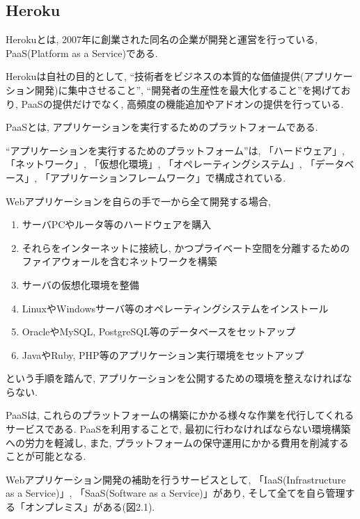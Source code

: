 \subsection{Heroku}
Herokuとは, 2007年に創業された同名の企業が開発と運営を行っている, PaaS(Platform as a Service)である.

Herokuは自社の目的として, “技術者をビジネスの本質的な価値提供(アプリケーション開発)に集中させること”, “開発者の生産性を最大化すること”を掲げており, PaaSの提供だけでなく, 高頻度の機能追加やアドオンの提供を行っている.

PaaSとは, アプリケーションを実行するためのプラットフォームである.

“アプリケーションを実行するためのプラットフォーム”は, 「ハードウェア」, 「ネットワーク」, 「仮想化環境」, 「オペレーティングシステム」, 「データベース」, 「アプリケーションフレームワーク」で構成されている.

Webアプリケーションを自らの手で一から全て開発する場合,

\begin{enumerate}
\item サーバPCやルータ等のハードウェアを購入

\item それらをインターネットに接続し, かつプライベート空間を分離するためのファイアウォールを含むネットワークを構築

\item サーバの仮想化環境を整備

\item LinuxやWindowsサーバ等のオペレーティングシステムをインストール

\item OracleやMySQL, PostgreSQL等のデータベースをセットアップ

\item JavaやRuby, PHP等のアプリケーション実行環境をセットアップ
\end{enumerate}

という手順を踏んで, アプリケーションを公開するための環境を整えなければならない.

PaaSは, これらのプラットフォームの構築にかかる様々な作業を代行してくれるサービスである.
PaaSを利用することで, 最初に行わなければならない環境構築への労力を軽減し, また, プラットフォームの保守運用にかかる費用を削減することが可能となる.

Webアプリケーション開発の補助を行うサービスとして, 「IaaS(Infrastructure as a Service)」, 「SaaS(Software as a Service)」があり, そして全てを自ら管理する「オンプレミス」がある(図2.1).


